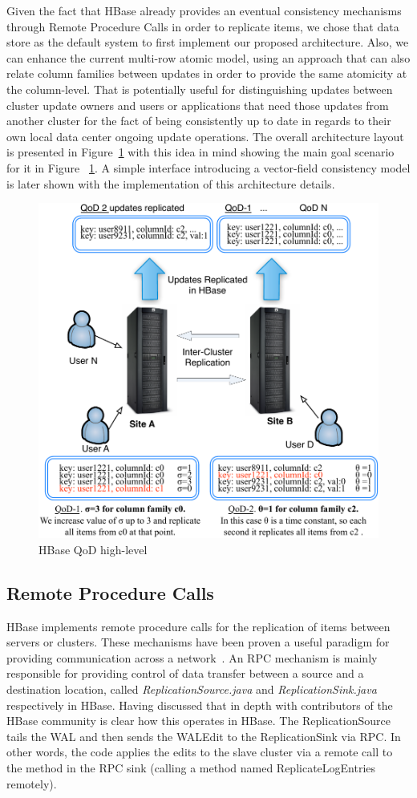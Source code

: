 Given the fact that HBase already provides an eventual consistency mechanisms through Remote Procedure Calls in order to replicate items, we chose that data store as the default system to first implement our proposed architecture. Also, we can enhance the current multi-row atomic model, using an approach that can also relate column families between updates in order to provide the same atomicity at the column-level. That is potentially useful for distinguishing updates between cluster update owners and users or applications that need those updates from another cluster for the fact of being consistently up to date in regards to their own local data center ongoing update operations. The overall architecture layout is presented in Figure~\ref{fig-high-level} with this idea in mind showing the main goal scenario for it in Figure ~\ref{fig-high-level}. A simple interface introducing a vector-field consistency model is later shown with the implementation of this architecture details.

\begin{figure}[t]
\centering
\includegraphics[width=0.8\linewidth]{figs/highlevel.pdf}
\caption{HBase QoD high-level}
\label{fig-high-level}
\end{figure}

\subsection{Remote Procedure Calls}
HBase implements remote procedure calls for the replication of items between servers or clusters. These mechanisms have been proven a useful paradigm for providing communication across a network~\cite{Birrell:1984}. An RPC mechanism is mainly responsible for providing control of data transfer between a source and a destination location, called \emph{ReplicationSource.java} and \emph{ReplicationSink.java} respectively in HBase. Having discussed that in depth with contributors of the HBase community is clear how this operates in HBase. The ReplicationSource tails the WAL and then sends the WALEdit to the ReplicationSink via RPC. In other words, the code applies the edits to the slave cluster via a remote call to the method in the RPC sink (calling a method named ReplicateLogEntries remotely).



